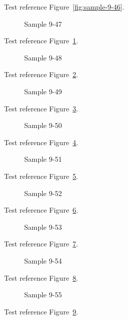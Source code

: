 Test reference Figure~\ref{fig:sample-9-46}.

\begin{figure}[tbhp]
\caption{Sample 9-47}
\label{fig:sample-9-47}
\end{figure}

Test reference Figure~\ref{fig:sample-9-47}.

\begin{figure}[tbhp]
\caption{Sample 9-48}
\label{fig:sample-9-48}
\end{figure}

Test reference Figure~\ref{fig:sample-9-48}.

\begin{figure}[tbhp]
\caption{Sample 9-49}
\label{fig:sample-9-49}
\end{figure}

Test reference Figure~\ref{fig:sample-9-49}.

\begin{figure}[tbhp]
\caption{Sample 9-50}
\label{fig:sample-9-50}
\end{figure}

Test reference Figure~\ref{fig:sample-9-50}.

\begin{figure}[tbhp]
\caption{Sample 9-51}
\label{fig:sample-9-51}
\end{figure}

Test reference Figure~\ref{fig:sample-9-51}.

\begin{figure}[tbhp]
\caption{Sample 9-52}
\label{fig:sample-9-52}
\end{figure}

Test reference Figure~\ref{fig:sample-9-52}.

\begin{figure}[tbhp]
\caption{Sample 9-53}
\label{fig:sample-9-53}
\end{figure}

Test reference Figure~\ref{fig:sample-9-53}.

\begin{figure}[tbhp]
\caption{Sample 9-54}
\label{fig:sample-9-54}
\end{figure}

Test reference Figure~\ref{fig:sample-9-54}.

\begin{figure}[tbhp]
\caption{Sample 9-55}
\label{fig:sample-9-55}
\end{figure}

Test reference Figure~\ref{fig:sample-9-55}.

